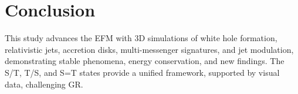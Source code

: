 \documentclass[11pt]{article}
\begin{document}
\section{Conclusion}
This study advances the EFM with 3D simulations of white hole formation, relativistic jets, accretion disks, multi-messenger signatures, and jet modulation, demonstrating stable phenomena, energy conservation, and new findings. The S/T, T/S, and S=T states provide a unified framework, supported by visual data, challenging GR.
\end{document}
